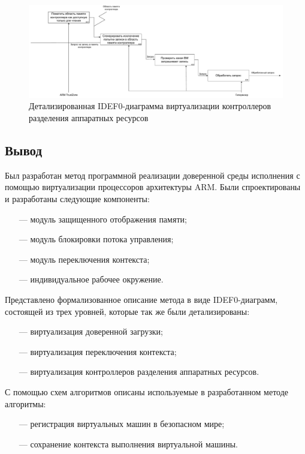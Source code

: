 \begin{figure}[h!]
	\centering
	\includegraphics[width=\textwidth]{img/idef0-trap-and-emulate-2.pdf}
	\caption{Детализированная IDEF0-диаграмма виртуализации контроллеров разделения аппаратных ресурсов}
	\label{fig:idef0-trap-and-emulate-2}
\end{figure}

\subsection*{Вывод}

Был разработан метод программной реализации доверенной среды исполнения с помощью виртуализации процессоров архитектуры ARM. Были спроектированы и разработаны следующие компоненты:

\begin{itemize}
	\item [---] модуль защищенного отображения памяти;
	\item [---] модуль блокировки потока управления;
	\item [---] модуль переключения контекста;
	\item [---] индивидуальное рабочее окружение.
\end{itemize}
 
Представлено формализованное описание метода в виде IDEF0-диаграмм, состоящей из трех уровней, которые так же были детализированы:

\begin{itemize}
	\item [---] виртуализация доверенной загрузки;
	\item [---] виртуализация переключения контекста;
	\item [---] виртуализация контроллеров разделения аппаратных ресурсов.
\end{itemize}

С помощью схем алгоритмов описаны используемые в разработанном методе алгоритмы:

\begin{itemize}
	\item [---] регистрация виртуальных машин в безопасном мире;
	\item [---] сохранение контекста выполнения виртуальной машины.
\end{itemize}

\pagebreak
